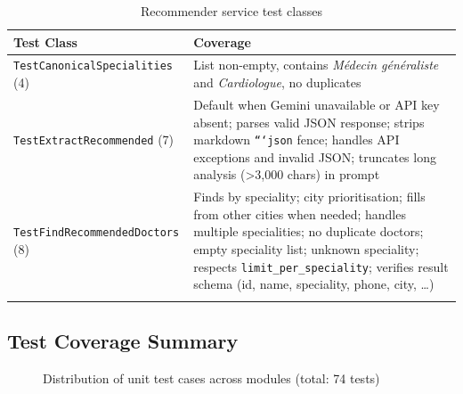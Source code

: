 \documentclass[12pt, a4paper]{article}
\begin{document}
\begin{longtable}{p{4cm} p{9cm}}
  \toprule
  \textbf{Test Class} & \textbf{Coverage} \\
  \midrule
  \texttt{TestCanonical\-Specialities} (4)
    & List non-empty, contains \textit{Médecin généraliste} and \textit{Cardiologue},
      no duplicates \\[4pt]
  \texttt{TestExtract\-Recommended} (7)
    & Default when Gemini unavailable or API key absent; parses valid JSON response;
      strips markdown \texttt{```json} fence; handles API exceptions and invalid JSON;
      truncates long analysis (>3,000 chars) in prompt \\[4pt]
  \texttt{TestFindRecommended\-Doctors} (8)
    & Finds by speciality; city prioritisation; fills from other cities when needed;
      handles multiple specialities; no duplicate doctors; empty speciality list;
      unknown speciality; respects \texttt{limit\_per\_speciality}; verifies
      result schema (id, name, speciality, phone, city, \ldots) \\
  \bottomrule
  \caption{Recommender service test classes}
\end{longtable}

\subsection{Test Coverage Summary}

\begin{figure}[H]
  \centering
  \caption{Distribution of unit test cases across modules (total: 74 tests)}
  \label{fig:test_distribution}
\end{figure}
\end{document}

